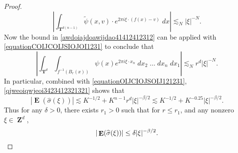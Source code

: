 \documentclass[dvipsnames,letterpaper,12pt]{article}
\numberwithin{equation}{section}
\DeclareMathOperator{\ZZ}{\mathbf{Z}}
\DeclareMathOperator{\TT}{\mathbf{T}}
\numberwithin{theorem}{section}
\DeclareMathOperator{\EE}{\mathbf{E}}
\begin{document}
\begin{proof}
    \begin{equation} \label{awdoiajdoawijdao41412412312}
        \left|\int_{\TT^{d(n-1)}} \tilde{\psi}(x,v) \cdot e^{2 \pi i \xi \cdot (f(x) - v)}\; dx \right| \lesssim_N |\xi|^{-N}.
    \end{equation}
    Now the bound in \eqref{awdoiajdoawijdao41412412312} can be applied with \eqref{equationCOIJCOIJSIOJOI1231} to conclude that
    \begin{equation} \label{qjweoiqwjeoi3423412321321}
        \left| \int_{\TT^d} \int_{f^{-1}(B_r(x))} \psi(x) e^{2 \pi i \xi \cdot x_n}\; dx_2\; \dots\; dx_n\; dx_1 \right| \lesssim_N r^d |\xi|^{-N}.
    \end{equation}
    In particular, combined with \eqref{equationOIJCIOJSOIJ121231}, \eqref{qjweoiqwjeoi3423412321321} shows that
    \begin{equation}
        |\EE(\widehat{\sigma}(\xi)) | \lesssim K^{-1/2} + K^{n-1} r^d |\xi|^{-\beta/2} \lesssim K^{-1/2} + K^{-0.25} |\xi|^{-\beta/2}.
    \end{equation}
    Thus for any $\delta > 0$, there exists $r_1 > 0$ such that for $r \leq r_1$, and any nonzero $\xi \in \ZZ^d$,
    \[ |\EE(\widehat{\sigma}(\xi))| \leq \delta |\xi|^{-\beta/2}. \qedhere \]

\end{proof}
\end{document}
